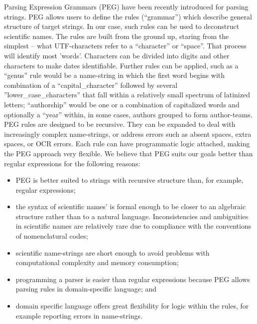 \documentclass{bmcart}
\begin{document}
Parsing Expression Grammars (PEG) \cite{Ford2004} have been recently introduced for parsing strings. PEG allows users to define the rules (``grammar'') which describe general structure
of target strings. In our case, such rules can be used to deconstruct scientific names.
The rules are built from the ground up, staring from the simplest -- what UTF-characters refer to a ``character'' or ``space''.  That process will identify most 'words'.  Characters can be divided into digits and other characters to make dates identifiable. Further rules can be applied, such as a ``genus'' rule would be a name-string in which the first word begins with combination of a
``capital\_character'' followed by several ''lower\_case\_characters'' that fall within a relatively small spectrum of latinized letters;  
``authorship'' would be one or a combination of capitalized words and optionally a ``year'' within, in some cases, authors grouped to form author-teams. PEG rules are designed to be recursive. They can be expanded to deal with increasingly complex name-strings, or address  errors such as absent spaces, extra spaces, or OCR errors. Each rule can have programmatic logic attached, making the PEG approach very flexible. We believe that PEG suits our goals
better than regular expressions for the following reasons:

\begin{itemize}

  \item PEG is better suited to strings with recursive structure than, for example, regular expressions;

  \item the syntax of scientific names' is formal enough to be closer to an algebraic
    structure rather than to a natural language. Inconsistencies and
    ambiguities in scientific names are relatively rare due to compliance with the conventions of nomenclatural codes;

  \item scientific name-strings are short enough to avoid problems with
    computational complexity and memory consumption;

  \item programming a parser is easier than regular expressions because
    PEG allows parsing rules in domain-specific language; and

  \item domain specific language offers great flexibility for logic within
    the rules, for example reporting errors in name-strings.

\end{itemize}
\end{document}
